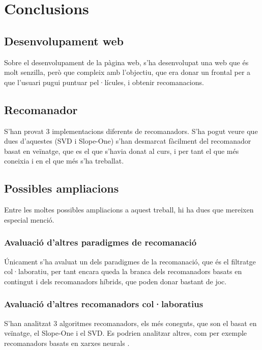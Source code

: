 \chapter{Conclusions}

\section{Desenvolupament web}

Sobre el desenvolupament de la pàgina web, s'ha desenvolupat una web que és molt senzilla, però que compleix amb l'objectiu, que era donar un frontal per a que l'usuari pugui puntuar pel·lícules, i obtenir recomanacions.

\section{Recomanador}

S'han provat 3 implementacions diferents de recomanadors. S'ha pogut veure que dues d'aquestes (SVD i Slope-One) s'han desmarcat fàcilment del recomanador basat en veïnatge, que es el que s'havia donat al curs, i per tant el que més coneixia i en el que més s'ha treballat.

\section{Possibles ampliacions}

Entre les moltes possibles ampliacions a aquest treball, hi ha dues que mereixen especial menció.

\subsection{Avaluació d'altres paradigmes de recomanació}

Únicament s'ha avaluat un dels paradigmes de la recomanació, que és el filtratge col·laboratiu, per tant encara queda la branca dels recomanadors basats en contingut i dels recomanadors híbrids, que poden donar bastant de joc.

\subsection{Avaluació d'altres recomanadors col·laboratius}

S'han analitzat 3 algoritmes recomanadors, els més coneguts, que son el basat en veïnatge, el Slope-One i el SVD. Es podrien analitzar altres, com per exemple recomanadors basats en xarxes neurals \cite{introduction-rbm}\cite{collaborative-filtering-som-cbr}\cite{rmb-collaborative-filtering}.